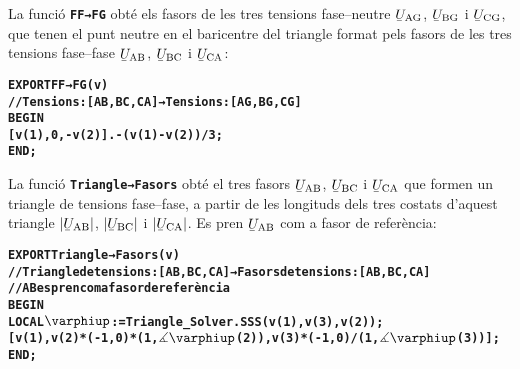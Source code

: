 La funció \texttt{\textbf{FF→FG}} obté els fasors de les tres tensions fase--neutre $\cmplx{U}\ped{AG}$, $\cmplx{U}\ped{BG}$ i $\cmplx{U}\ped{CG}$, que tenen el punt neutre en el baricentre del triangle format pels fasors de  les tres tensions fase--fase
$\cmplx{U}\ped{AB}$, $\cmplx{U}\ped{BC}$ i $\cmplx{U}\ped{CA}$:
\vspace{-6mm}
\begin{alltt}
\bfseries
    EXPORT FF→FG(v)
    // Tensions:[AB,BC,CA] → Tensions:[AG,BG,CG]
    BEGIN
      [v(1),0,-v(2)] .- (v(1)-v(2))/3;
    END;
\end{alltt}

La funció \texttt{\textbf{Triangle→Fasors}} obté el tres fasors $\cmplx{U}\ped{AB}$, $\cmplx{U}\ped{BC}$ i $\cmplx{U}\ped{CA}$ que formen un triangle de tensions fase--fase, a partir de les longituds dels tres costats d'aquest triangle $|\cmplx{U}\ped{AB}|$, $|\cmplx{U}\ped{BC}|$ i $|\cmplx{U}\ped{CA}|$. Es pren $\cmplx{U}\ped{AB}$ com a fasor de referència:
\vspace{-6mm}
\begin{alltt}
\bfseries
    EXPORT Triangle→Fasors(v)
    // Triangle de tensions:[AB,BC,CA] → Fasors de tensions:[AB,BC,CA]
    // AB es pren com a fasor de referència
    BEGIN
      LOCAL \(\varphiup\):=Triangle_Solver.SSS(v(1),v(3),v(2));
      [v(1),v(2)*(-1,0)*(1,\(\measuredangle\varphiup\)(2)),v(3)*(-1,0)/(1,\(\measuredangle\varphiup\)(3))];
    END;
\end{alltt}

